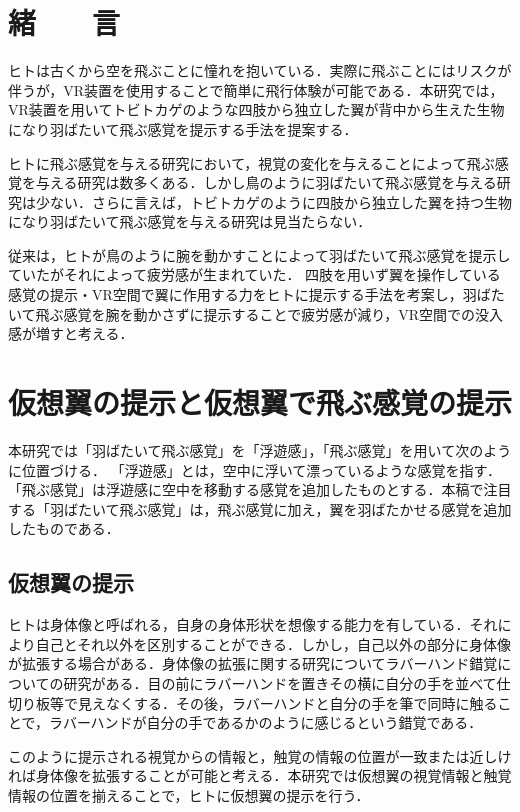 \begin{small}
\section{緒　　言}
  ヒトは古くから空を飛ぶことに憧れを抱いている．実際に飛ぶことにはリスクが伴うが，VR装置を使用することで簡単に飛行体験が可能である．本研究では，VR装置を用いてトビトカゲのような四肢から独立した翼が背中から生えた生物になり羽ばたいて飛ぶ感覚を提示する手法を提案する．
  
  ヒトに飛ぶ感覚を与える研究において，視覚の変化を与えることによって飛ぶ感覚を与える研究は数多くある．しかし鳥のように羽ばたいて飛ぶ感覚を与える研究は少ない．さらに言えば，トビトカゲのように四肢から独立した翼を持つ生物になり羽ばたいて飛ぶ感覚を与える研究は見当たらない．

  従来は，ヒトが鳥のように腕を動かすことによって羽ばたいて飛ぶ感覚を提示していたがそれによって疲労感が生まれていた．
  四肢を用いず翼を操作している感覚の提示・VR空間で翼に作用する力をヒトに提示する手法を考案し，羽ばたいて飛ぶ感覚を腕を動かさずに提示することで疲労感が減り，VR空間での没入感が増すと考える．


\section{仮想翼の提示と仮想翼で飛ぶ感覚の提示}
  本研究では「羽ばたいて飛ぶ感覚」を「浮遊感」，「飛ぶ感覚」を用いて次のように位置づける．
  「浮遊感」とは，空中に浮いて漂っているような感覚を指す．「飛ぶ感覚」は浮遊感に空中を移動する感覚を追加したものとする．本稿で注目する「羽ばたいて飛ぶ感覚」は，飛ぶ感覚に加え，翼を羽ばたかせる感覚を追加したものである．

  \subsection{仮想翼の提示}
    ヒトは身体像と呼ばれる，自身の身体形状を想像する能力を有している．それにより自己とそれ以外を区別することができる．しかし，自己以外の部分に身体像が拡張する場合がある．身体像の拡張に関する研究についてラバーハンド錯覚についての研究がある\cite{botvinick1998rubber}．目の前にラバーハンドを置きその横に自分の手を並べて仕切り板等で見えなくする．その後，ラバーハンドと自分の手を筆で同時に触ることで，ラバーハンドが自分の手であるかのように感じるという錯覚である．
    
    このように提示される視覚からの情報と，触覚の情報の位置が一致または近しければ身体像を拡張することが可能と考える．本研究では仮想翼の視覚情報と触覚情報の位置を揃えることで，ヒトに仮想翼の提示を行う．  


\end{small}
